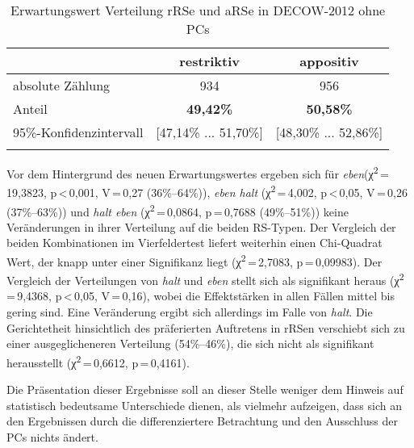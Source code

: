 \begin{table}
	\caption{\label{tab:805}Erwartungswert Verteilung rRSe und aRSe in DECOW-2012 ohne PCs}
 		\begin{tabular}[t]{lcc} 
 		\lsptoprule
   	 	& {restriktiv} & {appositiv} \\
   	 	\midrule
  		absolute Zählung & 934 & 956\\ 
   		Anteil & \textbf{49,42\%} & \textbf{50,58\%}\\
   		95\%-Konfidenzintervall & [47,14\% ... 51,70\%] & [48,30\% ... 52,86\%] \\
	      \lspbottomrule
 		\end{tabular}
\end{table}
Vor dem Hintergrund des neuen Erwartungswertes ergeben sich für \textit{eben}\linebreak (χ\textsuperscript{2}\,=\,19,3823, p\,<\,0,001, V\,=\,0,27 (36\%–64\%)), \textit{eben halt} (χ\textsuperscript{2}\,=\,4,002, p\,<\,0,05, V\,=\,0,26 (37\%–63\%)) und \textit{halt eben} (χ\textsuperscript{2}\,=\,0,0864, p\,=\,0,7688 (49\%–51\%)) keine Veränderungen in ihrer Verteilung auf die beiden RS-Typen. Der Vergleich der beiden Kombinationen im Vierfeldertest liefert weiterhin einen Chi-Quadrat Wert, der knapp unter einer Signifikanz liegt (χ\textsuperscript{2}\,=\,2,7083, p\,=\,0,09983). Der Vergleich der Verteilungen von \textit{halt} und \textit{eben} stellt sich als signifikant heraus (χ\textsuperscript{2}\,=\,9,4368, p\,<\,0,05, V\,=\,0,16), wobei die Effektstärken in allen Fällen mittel bis gering sind. Eine Veränderung ergibt sich allerdings im Falle von \textit{halt}. Die Gerichtetheit hinsichtlich des präferierten Auftretens in rRSen verschiebt sich zu einer ausgeglicheneren Verteilung (54\%–46\%), die sich nicht als signifikant herausstellt (χ\textsuperscript{2}\,=\,0,6612, p\,=\,0,4161). 

Die Präsentation dieser Ergebnisse soll an dieser Stelle weniger dem Hinweis auf statistisch bedeutsame Unterschiede dienen, als vielmehr aufzeigen, dass sich an den Ergebnissen durch die differenziertere Betrachtung und den Ausschluss der PCs nichts ändert.


